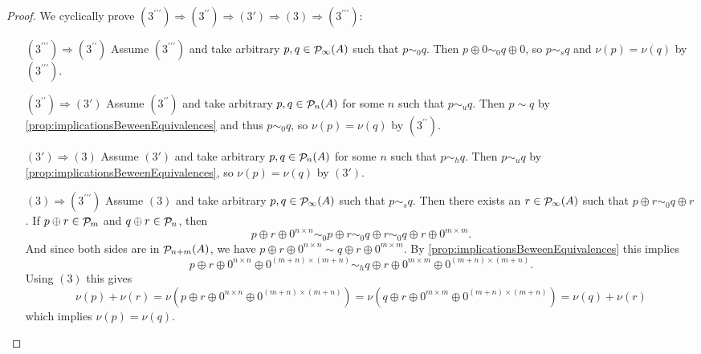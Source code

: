\begin{proof}
We cyclically prove $(3^{\prime\prime\prime}) \Rightarrow (3^{\prime\prime}) \Rightarrow (3') \Rightarrow (3) \Rightarrow (3^{\prime\prime\prime})$:
\begin{enumerate}
\item[$\boxed{(3^{\prime\prime\prime}) \Rightarrow (3^{\prime\prime})}$] Assume $(3^{\prime\prime\prime})$ and take arbitrary $p,q\in\mathop{\mathcal{P}}\nolimits_\infty(A)$ such that $p\sim_0 q$. Then $p\oplus 0 \sim_0 q\oplus 0$, so $p\sim_s q$ and $\nu(p)=\nu(q)$ by $(3^{\prime\prime\prime})$.
\item[$\boxed{(3^{\prime\prime}) \Rightarrow (3')}$] Assume $(3^{\prime\prime})$ and take arbitrary $p,q\in\mathop{\mathcal{P}}\nolimits_n(A)$ for some $n$ such that $p\sim_u q$. Then $p\sim q$ by \ref{prop:implicationsBeweenEquivalences} and thus $p\sim_0 q$, so $\nu(p)=\nu(q)$ by $(3^{\prime\prime})$.
\item[$\boxed{(3') \Rightarrow (3)}$] Assume $(3')$ and take arbitrary $p,q\in\mathop{\mathcal{P}}\nolimits_n(A)$ for some $n$ such that $p\sim_h q$. Then $p\sim_u q$ by \ref{prop:implicationsBeweenEquivalences}, so $\nu(p)=\nu(q)$ by $(3')$.
\item[$\boxed{(3) \Rightarrow (3^{\prime\prime\prime})}$] Assume $(3)$ and take arbitrary $p,q\in\mathop{\mathcal{P}}\nolimits_\infty(A)$ such that $p\sim_s q$. Then there exists an $r\in\mathop{\mathcal{P}}\nolimits_\infty(A)$ such that $p\oplus r \sim_0 q\oplus r$. If $p\oplus r\in\mathop{\mathcal{P}}\nolimits_m$ and $q\oplus r\in\mathop{\mathcal{P}}\nolimits_n$, then
\[ p \oplus r\oplus 0^{n\times n} \sim_0 p\oplus r \sim_0 q\oplus r \sim_0 q\oplus r\oplus 0^{m\times m}. \]
And since both sides are in $\mathop{\mathcal{P}}\nolimits_{n+m}(A)$, we have $p \oplus r\oplus 0^{n\times n} \sim q\oplus r\oplus 0^{m\times m}$. By \ref{prop:implicationsBeweenEquivalences} this implies
\[ p \oplus r\oplus 0^{n\times n}\oplus 0^{(m+n)\times(m+n)} \sim_h q\oplus r\oplus 0^{m\times m}\oplus 0^{(m+n)\times(m+n)}. \]
Using $(3)$ this gives
\[ \nu(p) + \nu(r) = \nu(p \oplus r\oplus 0^{n\times n}\oplus 0^{(m+n)\times(m+n)}) = \nu(q\oplus r\oplus 0^{m\times m}\oplus 0^{(m+n)\times(m+n)}) = \nu(q) +\nu(r) \]
which implies $\nu(p) = \nu(q)$.
\end{enumerate}
\end{proof}


